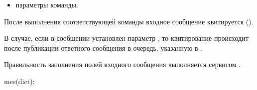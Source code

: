 \documentclass[a4paper,10pt,russian]{sphinxmanual}
\begin{document}
\begin{fulllineitems}
\begin{fulllineitems}
\begin{itemize}
\item {}
\sphinxAtStartPar
{} \sphinxhyphen{} параметры команды.

\end{itemize}

\sphinxAtStartPar
После выполнения соответствующей команды входное сообщение квитируется
().

\sphinxAtStartPar
В случае, если в сообщении установлен параметр ,
то квитирование происходит после публикации ответного сообщения в
очередь, указанную в .

\end{fulllineitems}



\begin{fulllineitems}

\pysigstartsignatures
{}
\pysigstopsignatures
\sphinxAtStartPar
Правильность заполнения полей входного сообщения выполняется
сервисом .
\begin{description}
\sphinxAtStartPar
mes(dict):
\begin{quote}

\begin{sphinxVerbatim}[commandchars=\\\{\}]
\PYG{p}{[}\PYG{p}{],}
\PYG{p}{[}\PYG{p}{],}
\PYG{p}{[}\PYG{p}{]}
\PYG{p}{[}\PYG{p}{]}
\end{sphinxVerbatim}
\end{quote}


\end{description}
\end{fulllineitems}
\end{fulllineitems}
\end{document}
